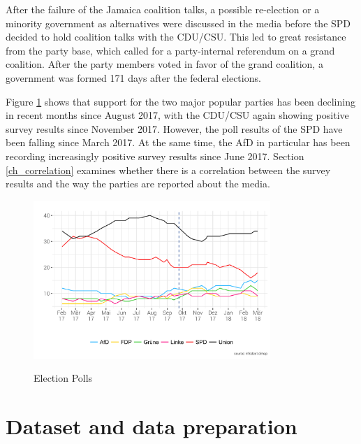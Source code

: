 \documentclass[12pt,a4paper,notitlepage]{article}
\begin{document}
After the failure of the Jamaica coalition talks, a possible re-election or a minority government as alternatives were discussed in the media before the SPD decided to hold coalition talks with the CDU/CSU. This led to great resistance from the party base, which called for a party-internal referendum on a grand coalition. After the party members voted in favor of the grand coalition, a government was formed 171 days after the federal elections. 

Figure \ref{fig_polls} shows that support for the two major popular parties has been declining in recent months since August 2017, with the CDU/CSU again showing positive survey results since November 2017. However, the poll results of the SPD have been falling since March 2017. At the same time, the AfD in particular has been recording increasingly positive survey results since June 2017. Section \ref{ch_correlation} examines whether there is a correlation between the survey results and the way the parties are reported about the media. 

\begin{figure}[H]
\begin{center}
	\caption{Election Polls}
	\includegraphics[width=0.8\textwidth]{figs/polls.png}
	\label{fig_polls}
	\end{center}
\end{figure}

\section{Dataset and data preparation}\label{ch_data}
\end{document}
